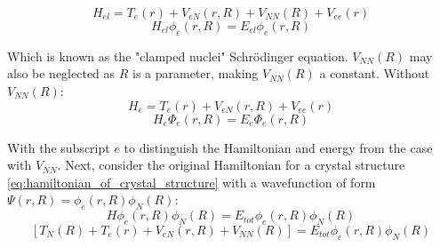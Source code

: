 \begin{equation}
    H_{el} = T_{e}\left(r\right) + V_{eN}\left(r,R\right) + V_{NN}\left(R\right) + V_{ee}\left(r\right)
    \label{eq:hamiltonian_fixed_nuclear}
\end{equation}
\begin{equation}
    H_{el}\phi_{e}\left(r,R\right) = E_{el}\phi_{e}\left(r,R\right)
    \label{eq:clamped_nuclear_schrodinger}
\end{equation}

Which is known as the "clamped nuclei" Schr{\"o}dinger equation. $V_{NN}\left(R\right)$ may also be neglected as $R$ is a parameter, making $V_{NN}\left(R\right)$ a constant. Without $V_{NN}\left(R\right)$:
\begin{equation}
    H_{e} = T_{e}\left(r\right) + V_{eN}\left(r,R\right) + V_{ee}\left(r\right)
    \label{eq:electronic_hamiltonian_clamped}
\end{equation}
\begin{equation}
    H_{e}\Phi_{e}\left(r,R\right) = E_{e}\Phi_{e}\left(r,R\right)
    \label{eq:electronic_hamiltonian_clamped_2}
\end{equation}

With the subscript $e$ to distinguish the Hamiltonian and energy from the case with $V_{NN}$. Next, consider the original Hamiltonian for a crystal structure \ref{eq:hamiltonian_of_crystal_structure} with a wavefunction of form $\Psi\left(r,R\right) = \phi_{e}\left(r,R\right)\phi_{N}\left(R\right)$:
\begin{equation}
    H\phi_{e}\left(r,R\right)\phi_{N}\left(R\right) = E_{tot}\phi_{e}\left(r,R\right)\phi_{N}\left(R\right)
    \label{eq:hamiltonian_with_wavefunction_inserted}
\end{equation}
\begin{equation}
    \left[ T_{N}\left(R\right) + T_{e}\left(r\right) + V_{eN}\left(r,R\right) + V_{NN}\left(R\right) \right] = E_{tot}\phi_{e}\left(r,R\right)\phi_{N}\left(R\right)
    \label{eq:hamiltonian_with_wavefunction_inserted_full}
\end{equation}

